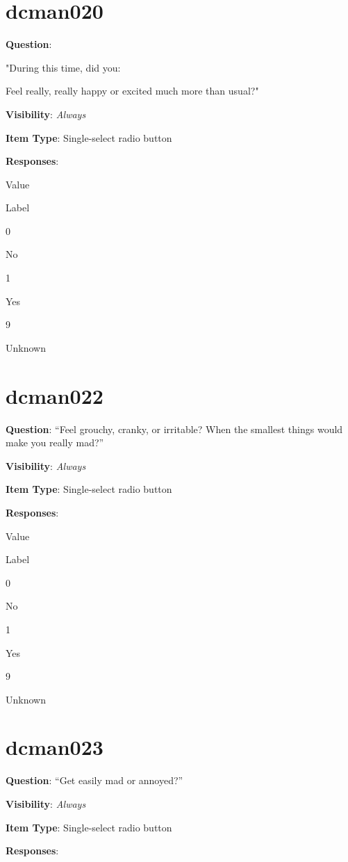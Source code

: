 \documentclass[]{book}
\begin{document}
\hypertarget{dcman020}{%
\section{dcman020}\label{dcman020}}

\textbf{Question}:

"During this time, did you:

Feel really, really happy or excited much more than usual?"

\textbf{Visibility}: \emph{Always}

\textbf{Item Type}: Single-select radio button

\textbf{Responses}:

Value

Label

0

No

1

Yes

9

Unknown

\hypertarget{dcman022}{%
\section{dcman022}\label{dcman022}}

\textbf{Question}: ``Feel grouchy, cranky, or irritable? When the smallest things would make you really mad?''

\textbf{Visibility}: \emph{Always}

\textbf{Item Type}: Single-select radio button

\textbf{Responses}:

Value

Label

0

No

1

Yes

9

Unknown

\hypertarget{dcman023}{%
\section{dcman023}\label{dcman023}}

\textbf{Question}: ``Get easily mad or annoyed?''

\textbf{Visibility}: \emph{Always}

\textbf{Item Type}: Single-select radio button

\textbf{Responses}:
\end{document}
